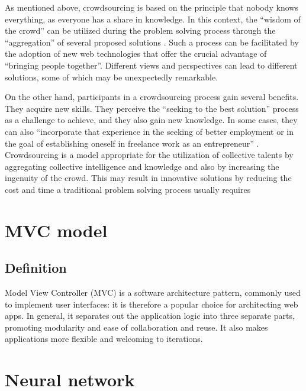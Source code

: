   As mentioned above, crowdsourcing is based on the principle that nobody knows everything, as everyone has a share in knowledge. In this context, the “wisdom of the crowd” can be utilized during the problem solving process through the “aggregation” of several proposed solutions \cite{doi101177}. Such a process can be facilitated by the adoption of new web technologies that offer the crucial advantage of “bringing people together”. Different views and perspectives can lead to different solutions, some of which may be unexpectedly remarkable.
  
  
  On the other hand, participants in a crowdsourcing process gain several benefits. They acquire new skills. They perceive the “seeking to the best solution” process as a challenge to achieve, and they also gain new knowledge. In some cases, they can also “incorporate that experience in the seeking of better employment or in the goal of establishing oneself in freelance work as an entrepreneur” \cite{doi101177}. Crowdsourcing is a model appropriate for the utilization of collective talents by aggregating collective intelligence and knowledge and also by increasing the ingenuity of the crowd. This may result in innovative solutions by reducing the cost and time a traditional problem solving process usually requires \cite{doi101177}

\section{MVC model}
\subsection{Definition}
Model View Controller (MVC) is a software architecture pattern, commonly used to implement user interfaces: it is therefore a popular choice for architecting web apps. In general, it separates out the application logic into three separate parts, promoting modularity and ease of collaboration and reuse. It also makes applications more flexible and welcoming to iterations.

\section{Neural network}

